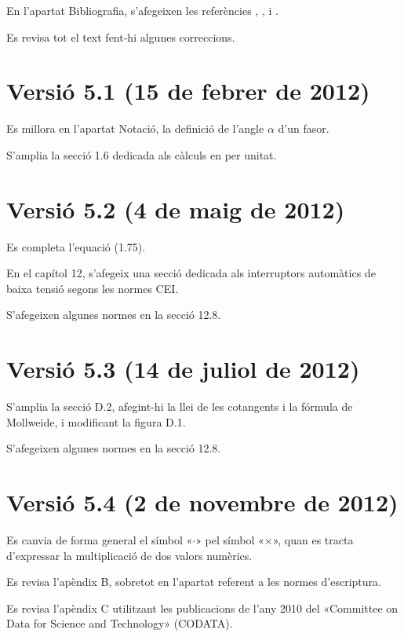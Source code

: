 En l'apartat Bibliografia, s'afegeixen les referències \cite{GRZ}, \cite{DUN}, \cite{REI} i \cite{TLE}.

Es revisa tot el text fent-hi algunes correccions.

\section*{Versió 5.1 (15 de febrer de 2012)}

Es millora en l'apartat Notació, la definició de l'angle $\alpha$ d'un fasor.

S'amplia la secció 1.6 dedicada als càlculs en per unitat.


\section*{Versió 5.2 (4 de maig de 2012)}

Es completa l'equació (1.75).

En el capítol 12, s'afegeix una secció dedicada als interruptors automàtics de baixa tensió segons les normes CEI.

S'afegeixen algunes normes en la secció 12.8.

\section*{Versió 5.3 (14 de juliol de 2012)}

S'amplia la secció D.2, afegint-hi la llei de les cotangents i la fórmula de Mollweide, i modificant  la figura D.1.

S'afegeixen algunes normes en la secció 12.8.

\section*{Versió 5.4 (2 de novembre de 2012)}

Es canvia de forma general el símbol «$\cdot$» pel símbol «$\times$», quan es tracta d'expressar la multiplicació de dos valors numèrics.

Es revisa l'apèndix B, sobretot en l'apartat referent a les normes d'escriptura.

Es revisa l'apèndix C utilitzant les publicacions de l'any 2010 del «Committee on Data for Science and Technology» (CODATA).

